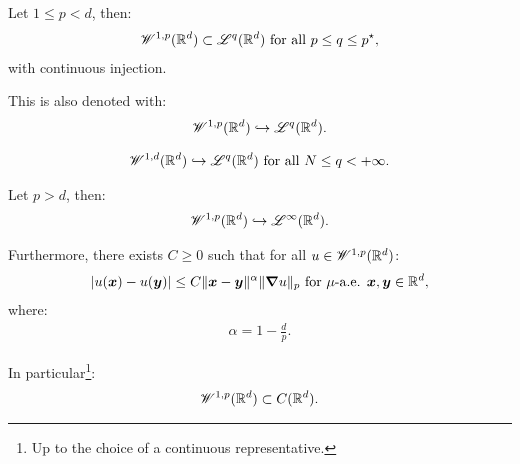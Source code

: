 \begin{corollary}
    Let $1 \leq p < d$, then:
    \begin{gather}
        \mathscr{W}^{1, p}(\mathbb{R}^{d}) \subset \mathscr{L}^{q}(\mathbb{R}^{d}) \text{ for all } p \leq q \leq p^{\star},
    \end{gather}
    with continuous injection.

    This is also denoted with:
    \begin{gather}
        \mathscr{W}^{1, p}(\mathbb{R}^{d}) \hookrightarrow \mathscr{L}^{q}(\mathbb{R}^{d}).
    \end{gather}
\end{corollary}

\begin{corollary}
    \begin{gather}
        \mathscr{W}^{1, d}(\mathbb{R}^{d}) \hookrightarrow \mathscr{L}^{q}(\mathbb{R}^{d}) \text{ for all } N \leq q < +\infty.
    \end{gather}
\end{corollary}

\begin{theorem}
    Let $p > d$, then:
    \begin{gather}
        \mathscr{W}^{1, p}(\mathbb{R}^{d}) \hookrightarrow \mathscr{L}^{\infty}(\mathbb{R}^{d}).
    \end{gather}

    Furthermore, there exists $C \geq 0$ such that for all $u \in \mathscr{W}^{1, p}(\mathbb{R}^{d})$:
    \begin{gather}
        \lvert u(\bm{x}) - u(\bm{y}) \rvert \leq C \lVert \bm{x} - \bm{y} \rVert^{\alpha} \lVert \bm{\nabla} u \rVert_p \text{ for } \mu \text{-a.e. } \bm{x}, \bm{y} \in \mathbb{R}^{d},
    \end{gather}
    where:
    \begin{gather}
        \alpha = 1 - \frac{d}{p}.
    \end{gather}

    In particular\footnote{Up to the choice of a continuous representative.}:
    \begin{gather}
        \mathscr{W}^{1, p}(\mathbb{R}^{d}) \subset C(\mathbb{R}^{d}).
    \end{gather}
\end{theorem}

